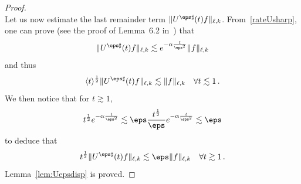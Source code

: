 \begin{proof}
\[\]
Let us now estimate the last remainder term $\|U^{\eps \sharp}(t) f\|_{\ell,k}$. From~\eqref{rateUsharp}, one can prove (see the proof of Lemma~6.2 in~\cite{Bardos-Ukai}) that
\begin{equation}\label{decayUepssharp}
\|U^{\eps \sharp}(t) f\|_{\ell,k} \lesssim e^{-\alpha \frac{t}{\eps^2}} \|f\|_{\ell,k}
\end{equation}
and thus
\[
\langle t \rangle^\frac12 \|U^{\eps \sharp}(t)f\|_{\ell,k}\lesssim \|f\|_{\ell,k} \quad \forall t \lesssim 1 \,.
\]
\goodbreak
We then notice that for $t \gtrsim 1$,
\[
t ^\frac12e^{-\alpha \frac{t}{\eps^2}} \lesssim \eps \frac{t^\frac12}{\eps} e^{-\alpha \frac{t}{\eps^2}} \lesssim \eps
\]
to deduce that
\[
t^\frac12 \|U^{\eps \sharp}(t)f\|_{\ell,k}\lesssim \eps \|f\|_{\ell,k} \quad \forall t \gtrsim 1 \,.
\]
Lemma~\ref{lem:Uepsdisp} is proved.
\end{proof}

